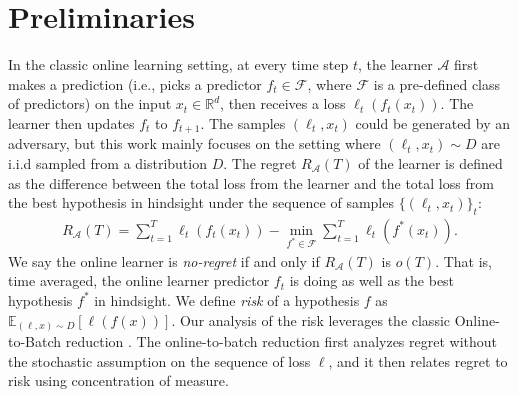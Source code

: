 


\section{Preliminaries}
\label{sec:sgb_preliminaries}
In the classic online learning setting, at every time step $t$, the learner $\mathcal{A}$ first makes a prediction (i.e., picks a predictor $f_t \in\mathcal{F}$, where $\mathcal{F}$ is a pre-defined class of predictors) on the input  $x_t\in\mathbb{R}^d$, then receives a loss $\ell_t(f_t(x_t))$. The learner then updates $f_t$ to $f_{t+1}$. The samples $(\ell_t,x_t)$ could be generated by an adversary, but this work mainly focuses on the setting where $(\ell_t,x_t)\sim D$ are i.i.d sampled from a distribution $D$.
The regret $R_{\mathcal{A}}(T)$ of the learner is defined as the difference between the total loss from the learner and the total loss from the best hypothesis in hindsight under the sequence of samples  $\{ (\ell_t, x_t) \}_t$:
\begin{align}
    R_{\mathcal{A}}(T) = \sum_{t=1}^T \ell_t(f_t(x_t)) - \min_{f^*\in\mathcal{F}}\sum_{t=1}^T\ell_t(f^*(x_t)).
\end{align} 
We say the online learner is \emph{no-regret} if and only if $R_{\mathcal{A}}(T)$ is $o(T)$. That is, time averaged, the online learner predictor $f_t$ is doing as well as the best hypothesis $f^*$ in hindsight. 
We define \emph{risk} of a hypothesis $f$ as $\mathbb{E}_{(\ell, x)\sim D}[\ell(f(x))]$. Our analysis of the risk leverages the classic Online-to-Batch reduction \citep{cesa2004generalization,JMLR:v15:hazan14a}. The online-to-batch reduction first analyzes  regret without the stochastic assumption on the sequence of loss $\ell$, and it then relates  regret to  risk using concentration of measure. 

